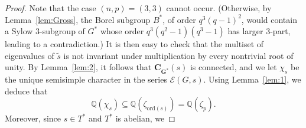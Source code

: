 \documentclass[12pt]{amsart}
\theoremstyle{definition}
\numberwithin{equation}{section}
\newcommand{\ord}{{\mathrm {ord}}}
\newcommand{\QQ}{{\mathbb Q}}
\newcommand{\EC}{\mathcal{E}}
\newcommand{\bC}{{\mathbf{C}}}
\newcommand{\bG}{{\mathbf{G}}}
\begin{document}
\begin{proof}
Note %
that the case $(n,p)=(3,3)$ cannot occur. (Otherwise, by
Lemma~\ref{lem:Gross}, the Borel subgroup $B^*$, of order
$q^3(q-1)^2$, would contain a Sylow $3$-subgroup of $G^*$ whose
order $q^3(q^2-1)(q^3-1)$ has larger $3$-part, leading to a
contradiction.) It is then easy to check that the multiset of
eigenvalues of $\widetilde{s}$ is not invariant under multiplication
by every nontrivial root of unity. By Lemma~\ref{lem:2}, %
it follows
that %
$\bC_{\bG^*}(s)$ is connected, and we let $\chi_s$ be the
unique semisimple character in the series $\EC(G,s)$. Using
Lemma~\ref{lem:1}, we deduce %
that
\[\QQ(\chi_{s})\subseteq\QQ(\zeta_{\ord(s)})=\QQ(\zeta_p).\] Moreover, %
since $s\in T^*$ and $T^*$ is abelian, we %

\end{proof}
\end{document}
